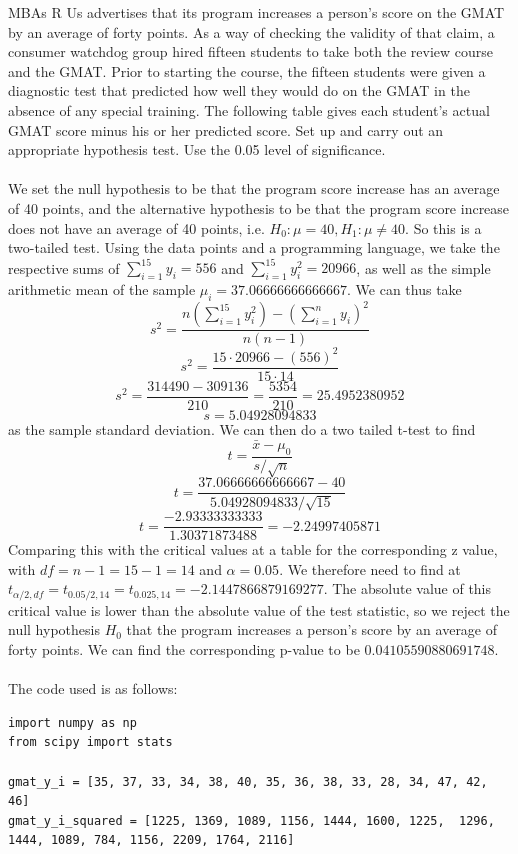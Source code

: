 \documentclass{article}
\begin{document}
{MBAs R Us advertises that its program increases a person's score on the GMAT by an average of forty points. As a way of checking the validity of that claim, a consumer watchdog group hired fifteen students to take both the review course and the GMAT. Prior to starting the course, the fifteen students were given a diagnostic test that predicted how well they would do on the GMAT in the absence of any special training. The following table gives each student's actual GMAT score minus his or her predicted score. Set up and carry out an appropriate hypothesis test. Use the 0.05 level of significance.
\\
\\ 
We set the null hypothesis to be that the program score increase has an average of 40 points, and the alternative hypothesis to be that the program score increase does not have an average of 40 points, i.e. \(H_0: \mu = 40, H_1: \mu \neq 40\).  So this is a two-tailed test. Using the data points and a programming language, we take the respective sums of \(\sum_{i=1}^{15} y_i = 556 \) and \(\sum_{i=1}^{15} y_i^2 = 20966\), as well as the simple arithmetic mean of the sample \(\mu_i = 37.06666666666667\). We can thus take 
\[
s^2 = \frac{ n(\sum_{i=1}^{15} y_i^2) - (\sum_{i=1}^{n} y_i)^2}{n(n-1)}
\]
\[
s^2 = \frac{15 \cdot 20966 - (556)^2}{15 \cdot 14}
\]
\[
s^2 = \frac{314490 - 309136}{210} = \frac{5354}{210} = 25.4952380952
\]
\[
s = 5.04928094833
\]
as the sample standard deviation. We can then do a two tailed t-test to find
\[
t = \frac{\bar{x}-\mu_0}{s/\sqrt{n}}
\]
\[
t = \frac{37.06666666666667 - 40}{5.04928094833 / \sqrt{15}}
\]
\[
t = \frac{-2.93333333333}{1.30371873488} = -2.24997405871
\]
Comparing this with the critical values  at a table for the corresponding z value, with \(df = n - 1 = 15 - 1 = 14\) and \(\alpha = 0.05\). We therefore need to find at \(t_{\alpha / 2, df } = t_{0.05 / 2, 14} = t_{0.025, 14} = -2.1447866879169277 \). The absolute value of this critical value is lower than the absolute value of the test statistic, so we reject the null hypothesis \(H_0\) that the program increases a person's score by an average of forty points. We can find the corresponding p-value to be \(0.04105590880691748\).
\\
\\
The code used is as follows:
\begin{verbatim}
import numpy as np
from scipy import stats

gmat_y_i = [35, 37, 33, 34, 38, 40, 35, 36, 38, 33, 28, 34, 47, 42, 46]
gmat_y_i_squared = [1225, 1369, 1089, 1156, 1444, 1600, 1225,  1296, 1444, 1089, 784, 1156, 2209, 1764, 2116]


\end{verbatim}}
\end{document}
